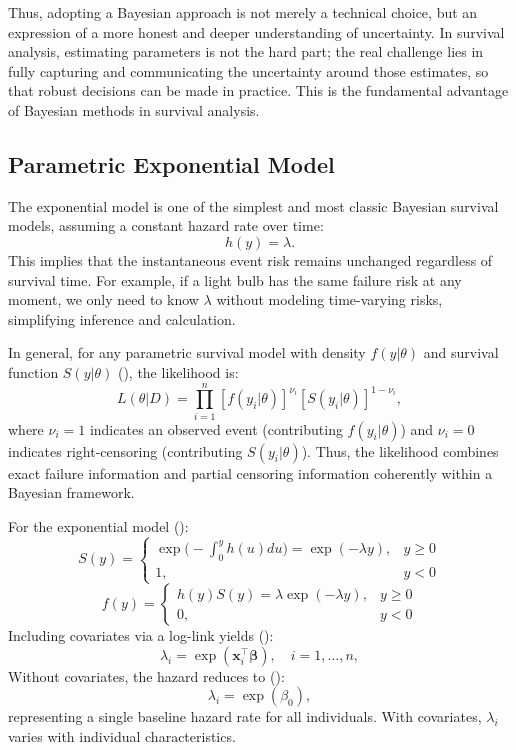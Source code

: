 Thus, adopting a Bayesian approach is not merely a technical choice, but an expression of a more honest and deeper understanding of uncertainty. In survival analysis, estimating parameters is not the hard part; the real challenge lies in fully capturing and communicating the uncertainty around those estimates, so that robust decisions can be made in practice. This is the fundamental advantage of Bayesian methods in survival analysis.











\subsection{Parametric Exponential Model} \label{Exponential Model}

The exponential model is one of the simplest and most classic Bayesian survival models, assuming a constant hazard rate over time:
$$
h(y) = \lambda.
$$
This implies that the instantaneous event risk remains unchanged regardless of survival time. For example, if a light bulb has the same failure risk at any moment, we only need to know $\lambda$ without modeling time-varying risks, simplifying inference and calculation.

In general, for any parametric survival model with density $f(y|\theta)$ and survival function $S(y|\theta)$ (\cite{enwiki:1270064454}), the likelihood is:
$$
L(\theta | D)
= \prod_{i=1}^n
[ f(y_i | \theta) ]^{\nu_i}
[ S(y_i | \theta) ]^{1 - \nu_i},
$$
where $\nu_i=1$ indicates an observed event (contributing $f(y_i|\theta)$) and $\nu_i=0$ indicates right-censoring (contributing $S(y_i|\theta)$). Thus, the likelihood combines exact failure information and partial censoring information coherently within a Bayesian framework.

For the exponential model (\cite{ibrahim2013bayesian}):
$$
S(y) = 
\begin{cases}
\exp\Big( -\int_0^y h(u) du \Big)=\exp(-\lambda y), & y \ge 0 \\
1, & y < 0 
\end{cases}
$$
$$
f(y) = 
\begin{cases}
h(y) S(y)=\lambda \exp(-\lambda y), & y \ge 0 \\
0, & y < 0
\end{cases}
$$
Including covariates via a log-link yields  (\cite{ibrahim2013bayesian}):
$$
\lambda_i = \exp(\mathbf{x}_i^\top \boldsymbol{\beta}),
\quad i = 1, \ldots, n,
$$
Without covariates, the hazard reduces to (\cite{chen2025survival}):
$$
\lambda_i = \exp(\beta_0),
$$
representing a single baseline hazard rate for all individuals. With covariates, $\lambda_i$ varies with individual characteristics.

